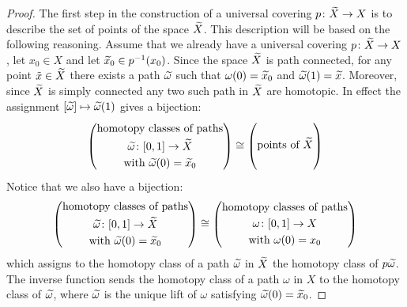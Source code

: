 \documentclass[11pt, letterpaper, oneside]{report}
\theoremstyle{pplain}
\theoremstyle{ddefinition}
\theoremstyle{nnn}
\theoremstyle{eexercise}
\newcommand{\nwidetilde}{\skew{4}\widetilde}
\begin{document}
\begin{proof}
The first step in the construction of 
a universal covering $p\colon \nwidetilde X \to X$ is to describe the set of  points of the space 
$\nwidetilde X$. This description will be based on the following reasoning. Assume that we already 
have a universal covering $p\colon \nwidetilde X \to X$, let $x_{0}\in X$ and let $\nwidetilde x_{0}\in p^{-1}(x_{0})$. 
Since the space $\nwidetilde X$ is path connected, for any point $\tilde x \in \nwidetilde X$ there exists 
a path $\nwidetilde\omega$ such that $\omega(0) = \nwidetilde x_{0}$ and 
$\nwidetilde \omega(1) = \nwidetilde x$. Moreover, 
since $\nwidetilde X$ is simply connected any two such path in $\nwidetilde X$ are homotopic. 
In effect the assignment $[\nwidetilde \omega] \mapsto \nwidetilde\omega(1)$ gives a bijection:
$$
\begin{pmatrix}
\text{homotopy classes of paths} \\[1mm]
\text{$\nwidetilde \omega\colon [0, 1] \to \nwidetilde X$} \\[1mm]
\text{with $\nwidetilde\omega(0) = \nwidetilde x_{0}$}
\end{pmatrix}
\cong 
\begin{pmatrix}
\text{ } \\[1mm]
\text{points of $\nwidetilde X$} \\[1mm]
\text{ } \\[1mm]
\end{pmatrix} 
$$
Notice  that we also have a bijection:
$$
\begin{pmatrix}
\text{homotopy classes of paths} \\[1mm]
\text{$\nwidetilde \omega\colon [0, 1] \to \nwidetilde X$} \\[1mm]
\text{with $\nwidetilde\omega(0) = \nwidetilde x_{0}$}
\end{pmatrix}
\cong 
\begin{pmatrix}
\text{homotopy classes of paths} \\[1mm]
\text{$ \omega\colon [0, 1] \to  X$} \\[1mm]
\text{with $\omega(0) =  x_{0}$}
\end{pmatrix}
$$
which assigns to the homotopy class of a path $\nwidetilde \omega$ in $\nwidetilde X$ the homotopy class
of $p\nwidetilde\omega$. The inverse function sends  the homotopy class of a path $\omega$  in $X$ to  
the homotopy class of $\nwidetilde \omega$, where  $\nwidetilde \omega$ is the unique lift of $\omega$ satisfying 
$\nwidetilde \omega(0) = \nwidetilde x_{0}$. 


\end{proof}
\end{document}
